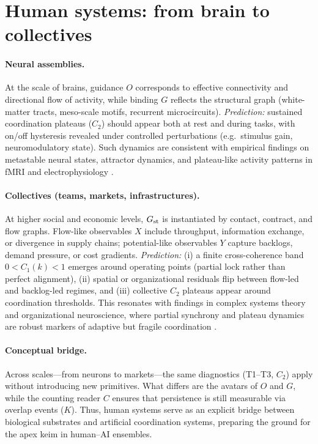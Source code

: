 \documentclass[12pt,a4paper,oneside]{scrreprt}
\begin{document}
\section{Human systems: from brain to collectives}\label{sec:human-systems}

\paragraph{Neural assemblies.} 
At the scale of brains, guidance $O$ corresponds to effective connectivity and directional flow of activity, while binding $G$ reflects the structural graph (white-matter tracts, meso-scale motifs, recurrent microcircuits). 
\emph{Prediction:} sustained coordination plateaus ($C_2$) should appear both at rest and during tasks, with on/off hysteresis revealed under controlled perturbations (e.g.\ stimulus gain, neuromodulatory state). 
Such dynamics are consistent with empirical findings on metastable neural states, attractor dynamics, and plateau-like activity patterns in fMRI and electrophysiology \cite{Deco2011, Rabinovich2008, Cocchi2017}. 

\paragraph{Collectives (teams, markets, infrastructures).}
At higher social and economic levels, $G_{\rm st}$ is instantiated by contact, contract, and flow graphs. 
Flow-like observables $X$ include throughput, information exchange, or divergence in supply chains; potential-like observables $Y$ capture backlogs, demand pressure, or cost gradients. 
\emph{Prediction:} (i) a finite cross-coherence band $0<C_1(k)<1$ emerges around operating points (partial lock rather than perfect alignment), (ii) spatial or organizational residuals flip between flow-led and backlog-led regimes, and (iii) collective $C_2$ plateaus appear around coordination thresholds. 
This resonates with findings in complex systems theory and organizational neuroscience, where partial synchrony and plateau dynamics are robust markers of adaptive but fragile coordination \cite{Helbing2013, Sumpter2010, Friston2017}. 

\paragraph{Conceptual bridge.}
Across scales—from neurons to markets—the same diagnostics (T1–T3, $C_2$) apply without introducing new primitives. 
What differs are the avatars of $O$ and $G$, while the counting reader $C$ ensures that persistence is still measurable via overlap events ($K$). 
Thus, human systems serve as an explicit bridge between biological substrates and artificial coordination systems, preparing the ground for the apex keim in human--AI ensembles.
\end{document}
